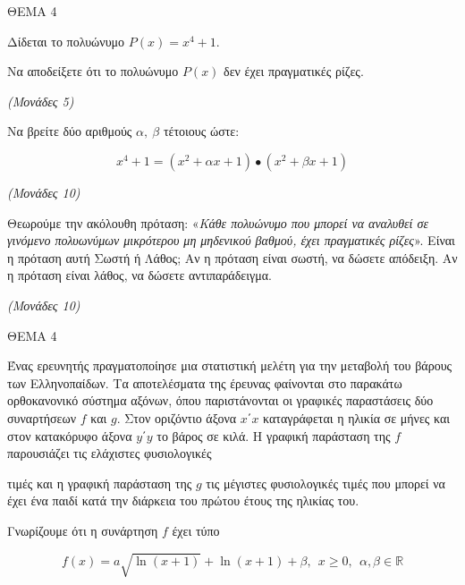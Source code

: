 \documentclass[11pt,a4paper,twoside]{book}
\newcommand{\monades}[1]{\hfill \textit{(Μονάδες #1)}}
\begin{document}
\vspace{4mm}

ΘΕΜΑ 4

Δίδεται το πολυώνυμο $P(x) = x^{4} + 1$.

\begin{alist}
\item Να αποδείξετε ότι το πολυώνυμο $P(x)$ δεν έχει πραγματικές ρίζες.

\monades{5}

\item Να βρείτε δύο αριθμούς $\alpha,\ \beta$ τέτοιους ώστε:

\begin{equation*}x^{4} + 1 = \left( x^{2} + \alpha x + 1 \right) \bullet \left( x^{2} + \beta x + 1 \right)\end{equation*}

\monades{10}

\item Θεωρούμε την ακόλουθη πρόταση: «\emph{Κάθε πολυώνυμο που μπορεί να αναλυθεί σε γινόμενο πολυωνύμων μικρότερου μη μηδενικού βαθμού, έχει πραγματικές ρίζες}». Είναι η πρόταση αυτή Σωστή ή Λάθος; Αν η πρόταση είναι σωστή, να δώσετε απόδειξη. Αν η πρόταση είναι λάθος, να δώσετε αντιπαράδειγμα.

\monades{10}
\end{alist}

\vspace{4mm}

ΘΕΜΑ 4

Ένας ερευνητής πραγματοποίησε μια στατιστική μελέτη για την μεταβολή του βάρους των Ελληνοπαίδων. Τα αποτελέσματα της έρευνας φαίνονται στο παρακάτω ορθοκανονικό σύστημα αξόνων, όπου παριστάνονται οι γραφικές παραστάσεις δύο συναρτήσεων $f$ και $g$. Στον οριζόντιο άξονα $x΄x$ καταγράφεται η ηλικία σε μήνες και στον κατακόρυφο άξονα $y΄y$ το βάρος σε κιλά. H γραφική παράσταση της $f$ παρουσιάζει τις ελάχιστες φυσιολογικές

τιμές και η γραφική παράσταση της $g$ τις μέγιστες φυσιολογικές τιμές που μπορεί να έχει ένα παιδί κατά την διάρκεια του πρώτου έτους της ηλικίας του.

Γνωρίζουμε ότι η συνάρτηση $f$ έχει τύπο

\begin{equation*}f(x) = a\sqrt{\ln(x + 1)} + \ln(x + 1) + \beta,\ \ x \geq 0,\ \ \alpha,\beta\mathbb{\in R}\end{equation*}
\end{document}
